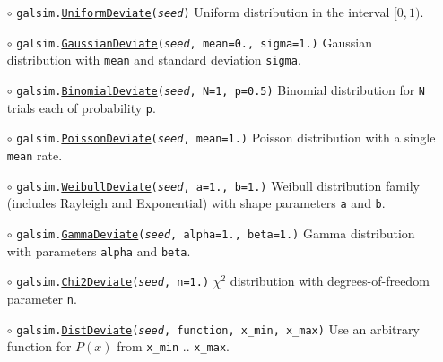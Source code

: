 \documentclass[preprint,10pt]{../../devel/modules/aastex}
\begin{document}
\begin{itemize}

  \item[$\circ$] 
  \texttt{galsim.\href{http://galsim-developers.github.io/GalSim/classgalsim_1_1_uniform_deviate.html}{UniformDeviate}(\emph{seed})} 
    \newline 
    Uniform distribution in the interval $[0, 1)$.

  \item[$\circ$] 
  \texttt{galsim.\href{http://galsim-developers.github.io/GalSim/classgalsim_1_1_gaussian_deviate.html}{GaussianDeviate}(\emph{seed}, mean=0., sigma=1.)} 
    \newline 
    Gaussian distribution with \texttt{mean} and standard deviation \texttt{sigma}.

  \item[$\circ$] 
  \texttt{galsim.\href{http://galsim-developers.github.io/GalSim/classgalsim_1_1_binomial_deviate.html}{BinomialDeviate}(\emph{seed}, N=1, p=0.5)}
    \newline 
    Binomial distribution for \texttt{N} trials each of probability \texttt{p}.

  \item[$\circ$] 
  \texttt{galsim.\href{http://galsim-developers.github.io/GalSim/classgalsim_1_1_poisson_deviate.html}{PoissonDeviate}(\emph{seed}, mean=1.)} 
    \newline 
    Poisson distribution with a single \texttt{mean} rate.

  \item[$\circ$] 
  \texttt{galsim.\href{http://galsim-developers.github.io/GalSim/classgalsim_1_1_weibull_deviate.html}{WeibullDeviate}(\emph{seed}, a=1., b=1.)} 
    \newline 
    Weibull distribution family (includes Rayleigh and Exponential) with shape parameters 
    \texttt{a} and \texttt{b}.

  \item[$\circ$] 
  \texttt{galsim.\href{http://galsim-developers.github.io/GalSim/classgalsim_1_1_gamma_deviate.html}{GammaDeviate}(\emph{seed}, alpha=1., beta=1.)} 
    \newline 
    Gamma distribution with parameters \texttt{alpha} and \texttt{beta}.

  \item[$\circ$] 
  \texttt{galsim.\href{http://galsim-developers.github.io/GalSim/classgalsim_1_1_chi2_deviate.html}{Chi2Deviate}(\emph{seed}, n=1.)} 
    \newline 
    $\chi^2$ distribution with degrees-of-freedom parameter \texttt{n}.

  \item[$\circ$] 
  \texttt{galsim.\href{http://galsim-developers.github.io/GalSim/classgalsim_1_1random_1_1_dist_deviate.html}{DistDeviate}(\emph{seed}, function, x\_min, x\_max)}  
    \newline 
    Use an arbitrary function for $P(x)$ from \texttt{x\_min} .. \texttt{x\_max}.

\end{itemize}
\end{document}
